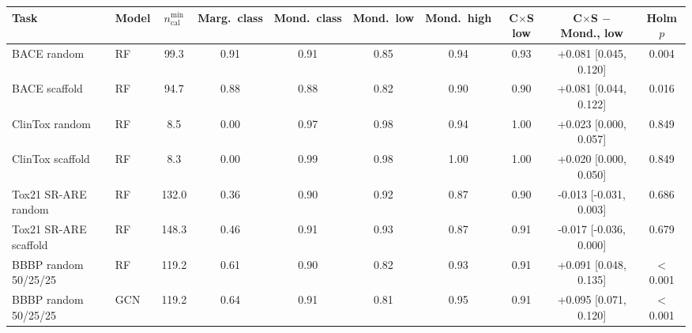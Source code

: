 \begin{tabular}{llcccccccc}
\toprule
Task & Model & $n^{\mathrm{min}}_{\mathrm{cal}}$ & Marg.\ class & Mond.\ class & Mond.\ low & Mond.\ high & C$\times$S low & C$\times$S $-$ Mond., low & Holm $p$\\
\midrule
BACE random & RF & 99.3 & 0.91 & 0.91 & 0.85 & 0.94 & 0.93 & +0.081 [0.045, 0.120] & 0.004\\
BACE scaffold & RF & 94.7 & 0.88 & 0.88 & 0.82 & 0.90 & 0.90 & +0.081 [0.044, 0.122] & 0.016\\
ClinTox random & RF & 8.5 & 0.00 & 0.97 & 0.98 & 0.94 & 1.00 & +0.023 [0.000, 0.057] & 0.849\\
ClinTox scaffold & RF & 8.3 & 0.00 & 0.99 & 0.98 & 1.00 & 1.00 & +0.020 [0.000, 0.050] & 0.849\\
Tox21 SR-ARE random & RF & 132.0 & 0.36 & 0.90 & 0.92 & 0.87 & 0.90 & -0.013 [-0.031, 0.003] & 0.686\\
Tox21 SR-ARE scaffold & RF & 148.3 & 0.46 & 0.91 & 0.93 & 0.87 & 0.91 & -0.017 [-0.036, 0.000] & 0.679\\
\midrule
BBBP random 50/25/25 & RF & 119.2 & 0.61 & 0.90 & 0.82 & 0.93 & 0.91 & +0.091 [0.048, 0.135] & $<$0.001\\
BBBP random 50/25/25 & GCN & 119.2 & 0.64 & 0.91 & 0.81 & 0.95 & 0.91 & +0.095 [0.071, 0.120] & $<$0.001\\
\bottomrule
\end{tabular}
